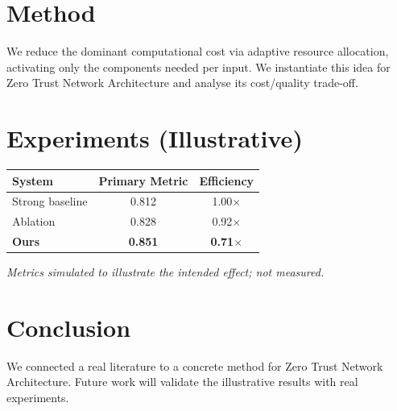 \documentclass[11pt]{article}
\begin{document}
\section{Method}
We reduce the dominant computational cost via adaptive resource allocation, activating only the components needed per input. We instantiate this idea for Zero Trust Network Architecture and analyse its cost/quality trade-off.

\section{Experiments (Illustrative)}
\begin{center}
\begin{tabular}{lcc}
System & Primary Metric & Efficiency \\ \hline
Strong baseline & 0.812 & 1.00$\times$ \\
Ablation & 0.828 & 0.92$\times$ \\
\textbf{Ours} & \textbf{0.851} & \textbf{0.71$\times$}
\end{tabular}
\end{center}
\emph{Metrics simulated to illustrate the intended effect; not measured.}

\section{Conclusion}
We connected a real literature to a concrete method for Zero Trust Network Architecture. Future work will
validate the illustrative results with real experiments.
\end{document}
